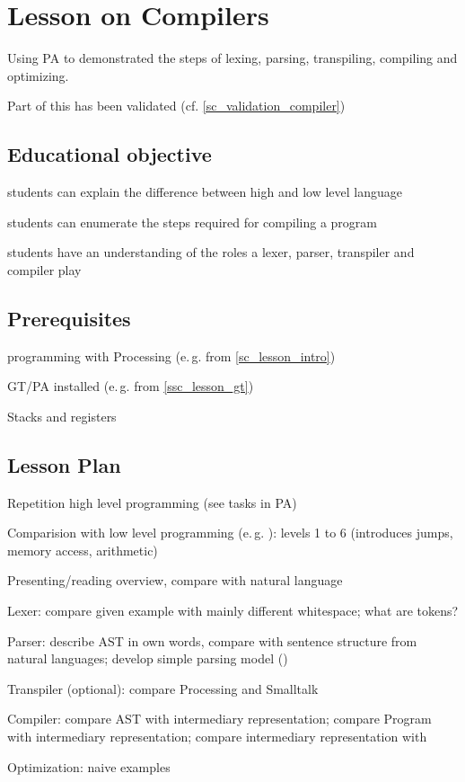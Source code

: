 \section{Lesson on Compilers} \label{sc_lesson_compiler}
Using PA to demonstrated the steps of lexing, parsing, transpiling, compiling and optimizing.

Part of this has been validated (cf. \ref{sc_validation_compiler})

\subsection{Educational objective}

\begin{todo}
\item students can explain the difference between high and low level language
\item students can enumerate the steps required for compiling a program
\item students have an understanding of the roles a lexer, parser, transpiler and compiler play
\end{todo}


\subsection{Prerequisites}

\begin{todo}
\item programming with Processing (e.\,g. from \ref{sc_lesson_intro})
\item GT/PA installed (e.\,g. from \ref{ssc_lesson_gt})
\item Stacks and registers
\end{todo}


\subsection{Lesson Plan}

\begin{todo}
\item Repetition high level programming (see tasks in PA)
\item Comparision with low level programming (e.\,g. \cite{Tom15}): levels 1 to 6 (introduces jumps, memory access, arithmetic)
\item Presenting/reading overview, compare with natural language
\item Lexer: compare given example with mainly different whitespace; what are tokens?
\item Parser: describe AST in own words, compare with sentence structure from natural languages; develop simple parsing model ()
\item Transpiler (optional): compare Processing and Smalltalk
\item Compiler: compare AST with intermediary representation; compare Program with intermediary representation; compare intermediary representation with \cite{Tom15}
\item Optimization: naive examples
\end{todo}


